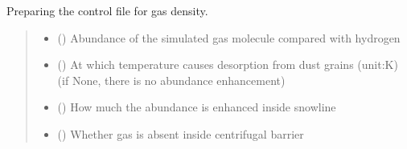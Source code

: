 \documentclass[a4paper,11pt,english]{sphinxmanual}
\begin{document}
\begin{fulllineitems}
\begin{fulllineitems}
\label{\detokenize{radmc3d:setup.radmc3d_setup.get_gasdensitycontrol}}
\pysigstartsignatures
\pysiglinewithargsret
{}
{\sphinxparamcomma {}\sphinxparamcomma {}\sphinxparamcomma {}\sphinxparamcomma {}}
{}
\pysigstopsignatures
\sphinxAtStartPar
Preparing the control file for gas density.
\begin{quote}\begin{description}
\begin{itemize}
\item {} 
\sphinxAtStartPar
{} () \textendash{} Abundance of the simulated gas molecule compared with hydrogen

\item {} 
\sphinxAtStartPar
{} () \textendash{} At which temperature causes desorption from dust grains (unit:K)
(if None, there is no abundance enhancement)

\item {} 
\sphinxAtStartPar
{} () \textendash{} How much the abundance is enhanced inside snowline

\item {} 
\sphinxAtStartPar
{} () \textendash{} Whether gas is absent inside centrifugal barrier

\end{itemize}

\end{description}\end{quote}

\end{fulllineitems}



\end{fulllineitems}
\end{document}
